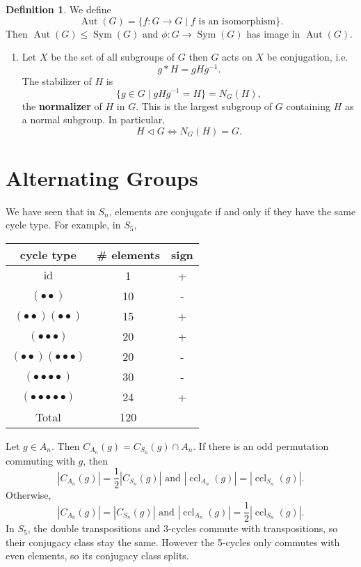 \documentclass[12pt]{article}
\DeclareMathOperator{\id}{id}
\DeclareMathOperator{\Sym}{Sym}
\DeclareMathOperator{\ccl}{ccl}
\DeclareMathOperator{\Aut}{Aut}
\theoremstyle{definition}
\newtheorem{definition}{Definition}[section]
\theoremstyle{remark}
\begin{document}
\begin{definition}
	We define
	\[
		\Aut(G) = \{f : G \to G \mid f \text{ is an isomorphism}\}
	.\]
	Then $\Aut(G) \leq \Sym(G)$ and $\phi : G \to \Sym(G)$ has image in $\Aut(G)$.
\end{definition}

\begin{enumerate}[resume, label = (\roman*)]
	\item Let $X$ be the set of all subgroups of $G$ then $G$ acts on $X$ be conjugation, i.e.
		\[
		g \ast H = g H g^{-1}
		.\]
		The stabilizer of $H$ is
		\[
			\{g \in G \mid gHg^{-1} = H\} = N_G(H)
		,\]
		the \textbf{normalizer} of $H$ in $G$. This is the largest subgroup of $G$ containing $H$ as a normal subgroup. In particular,
		\[
			H \lhd G \iff N_G(H) = G
		.\]
\end{enumerate}

\newpage

\section{Alternating Groups}%
\label{sec:alternating_groups}

We have seen that in $S_n$, elements are conjugate if and only if they have the same cycle type. For example, in $S_5$,

\begin{center}
\begin{tabular}{c|c|c}
	cycle type & \# elements & sign \\
	\hline
	$\id$ & 1 & + \\
	$(\bullet \bullet)$ & 10 & - \\
	$(\bullet \bullet)(\bullet \bullet)$ & 15 & + \\
	$(\bullet \bullet \bullet)$ & 20 & + \\
	$(\bullet \bullet)(\bullet \bullet \bullet)$ & 20 & - \\
	$(\bullet \bullet \bullet \bullet)$ & 30 & - \\
	$(\bullet \bullet \bullet \bullet \bullet)$ & 24 & + \\
	\hline
	Total & 120 &  \\
\end{tabular}
\end{center}

Let $g \in A_n$. Then $C_{A_n}(g) = C_{S_n}(g) \cap A_n$. If there is an odd permutation commuting with $g$, then
\[
	|C_{A_n}(g)| = \frac{1}{2}|C_{S_n}(g)| \text{ and } |\!\ccl_{A_n}(g)| = |\!\ccl_{S_n}(g)|
.\]
Otherwise,
\[
	|C_{A_n}(g)| = |C_{S_n}(g)| \text{ and } |\!\ccl_{A_n}(g)| = \frac{1}{2}|\!\ccl_{S_n}(g)|
.\]
In $S_5$, the double transpositions and 3-cycles commute with transpositions, so their conjugacy class stay the same. However the 5-cycles only commutes with even elements, so its conjugacy class splits.
\end{document}
